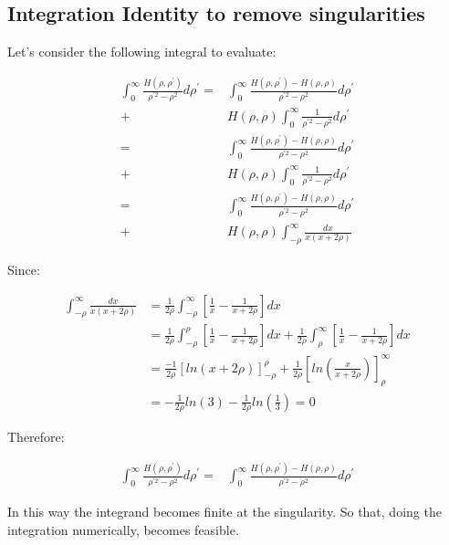 \documentclass[11pt, oneside]{article}   	%
\begin{document}
\subsection{Integration Identity to remove singularities}

Let's consider the following integral to evaluate:

\begin{align*}
\int_{0}^{\infty}\frac{H(\rho,\rho^{\prime})}{\rho^{\prime2}-\rho^{2}}d\rho^{\prime}= & \int_{0}^{\infty}\frac{H(\rho,\rho^{\prime})-H(\rho,\rho)}{\rho^{\prime2}-\rho^{2}}d\rho^{\prime}\\
+ & H(\rho,\rho)\int_{0}^{\infty}\frac{1}{\rho^{\prime2}-\rho^{2}}d\rho^{\prime}\\
= & \int_{0}^{\infty}\frac{H(\rho,\rho^{\prime})-H(\rho,\rho)}{\rho^{\prime2}-\rho^{2}}d\rho^{\prime}\\
+ & H(\rho,\rho)\int_{0}^{\infty}\frac{1}{\rho^{\prime2}-\rho^{2}}d\rho^{\prime}\\
= & \int_{0}^{\infty}\frac{H(\rho,\rho^{\prime})-H(\rho,\rho)}{\rho^{\prime2}-\rho^{2}}d\rho^{\prime}\\
+ & H(\rho,\rho)\int_{-\rho}^{\infty}\frac{dx}{x\left(x+2\rho\right)}
\end{align*}


Since:

\begin{align*}
\int_{-\rho}^{\infty}\frac{dx}{x\left(x+2\rho\right)} & =\frac{1}{2\rho}\int_{-\rho}^{\infty}\left[\frac{1}{x}-\frac{1}{x+2\rho}\right]dx\\
 & =\frac{1}{2\rho}\int_{-\rho}^{\rho}\left[\frac{1}{x}-\frac{1}{x+2\rho}\right]dx+\frac{1}{2\rho}\int_{\rho}^{\infty}\left[\frac{1}{x}-\frac{1}{x+2\rho}\right]dx\\
 & =\frac{-1}{2\rho}\left[ln\left(x+2\rho\right)\right]_{-\rho}^{\rho}+\frac{1}{2\rho}\left[ln\left(\frac{x}{x+2\rho}\right)\right]_{\rho}^{\infty}\\
 & =-\frac{1}{2\rho}ln\left(3\right)-\frac{1}{2\rho}ln\left(\frac{1}{3}\right)=0
\end{align*}


Therefore:

\begin{align*}
\int_{0}^{\infty}\frac{H(\rho,\rho^{\prime})}{\rho^{\prime2}-\rho^{2}}d\rho^{\prime}= & \int_{0}^{\infty}\frac{H(\rho,\rho^{\prime})-H(\rho,\rho)}{\rho^{\prime2}-\rho^{2}}d\rho^{\prime}
\end{align*}


In this way the integrand becomes finite at the singularity. So that,
doing the integration numerically, becomes feasible.
\end{document}
